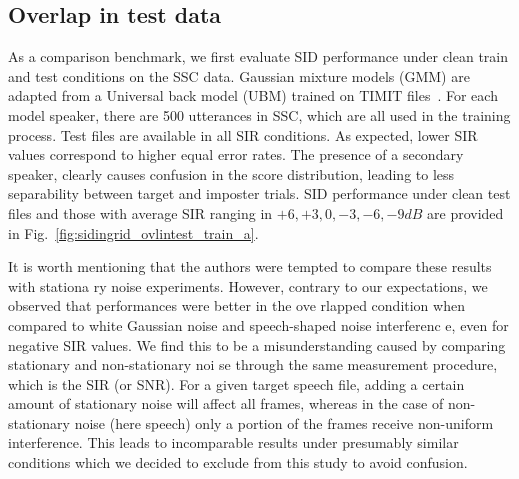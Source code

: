 \subsection{Overlap in test data}
As a comparison benchmark, we first evaluate SID performance under clean train and test conditions on the SSC data.
Gaussian mixture models (GMM) are adapted from a Universal back model (UBM) trained on TIMIT files~\cite{msridentity}.
For each model speaker, there are 500 utterances in SSC, which are all used in the training process. Test files are available in all SIR conditions.
As expected, lower SIR values correspond to higher equal error rates.
The presence of a secondary speaker, clearly causes confusion in the score distribution, leading to less separability between target and imposter trials.
SID performance under clean test files and those with average SIR ranging in $+6, +3, 0, -3
, -6, -9 dB$ are provided in Fig.~\ref{fig:sidingrid_ovlintest_train_a}.

It is worth mentioning that the authors were tempted to compare these results with stationa
ry noise experiments.
However, contrary to our expectations, we observed that performances were better in the ove
rlapped condition when compared to white Gaussian noise and speech-shaped noise interferenc
e, even for negative SIR values.
We find this to be a misunderstanding caused by comparing stationary and non-stationary noi
se through the same measurement procedure, which is the SIR (or SNR).
For a given target speech file, adding a certain amount of stationary noise will affect all frames, whereas in the case of non-stationary noise (here speech) only a portion of the frames receive non-uniform interference.
This leads to incomparable results under presumably similar conditions which we decided to exclude from this study to avoid confusion.

